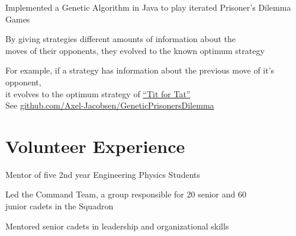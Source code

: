 \documentclass[]{deedy-resume-openfont}
\begin{document}
\begin{tightemize}
	\item Implemented a Genetic Algorithm in Java to play iterated Prisoner's Dilemma Games
	\item By giving strategies different amounts of information about the \\ moves of their opponents, they evolved to the known optimum strategy
	\item For example, if a strategy has information about the previous move of it's opponent,\\ it evolves to the optimum strategy of \href{https://en.wikipedia.org/wiki/Tit_for_tat}{``Tit for Tat''} \\
    See \href{https://github.com/Axel-Jacobsen/GeneticPrisonersDilemma}{github.com/Axel-Jacobsen/GeneticPrisonersDilemma}
    \vspace{15pt}
\end{tightemize}
\sectionsep

\section{Volunteer Experience}
\begin{tightemize}
	\item Mentor of five 2nd year Engineering Physics Students
\end{tightemize}
\sectionsep

\begin{tightemize}
	\item Led the Command Team, a group responsible for 20 senior and 60 \\  junior cadets in the Squadron
    \item Mentored senior cadets in leadership and organizational skills
    \vspace{15pt}
\end{tightemize}
\sectionsep
\end{document}
